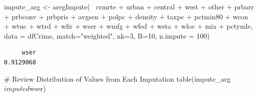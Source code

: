 \documentclass[]{article}
\newenvironment{Shaded}{}{}
\newcommand{\CommentTok}[1]{\textcolor[rgb]{0.00,0.50,0.00}{#1}}
\newcommand{\DataTypeTok}[1]{#1}
\newcommand{\DecValTok}[1]{#1}
\newcommand{\KeywordTok}[1]{\textcolor[rgb]{0.00,0.00,1.00}{#1}}
\newcommand{\NormalTok}[1]{#1}
\newcommand{\OperatorTok}[1]{#1}
\newcommand{\StringTok}[1]{\textcolor[rgb]{0.00,0.50,0.50}{#1}}
\begin{document}
\begin{Shaded}
\begin{Highlighting}[]
\NormalTok{impute_arg <-}\StringTok{ }\KeywordTok{aregImpute}\NormalTok{(}\OperatorTok{~}\StringTok{ }\NormalTok{crmrte }\OperatorTok{+}\StringTok{  }\NormalTok{urban }\OperatorTok{+}\StringTok{ }\NormalTok{central }\OperatorTok{+}\StringTok{ }\NormalTok{west }\OperatorTok{+}\StringTok{ }\NormalTok{other }\OperatorTok{+}
\StringTok{                         }\NormalTok{prbarr }\OperatorTok{+}\StringTok{ }\NormalTok{prbconv }\OperatorTok{+}\StringTok{ }\NormalTok{prbpris }\OperatorTok{+}\StringTok{ }\NormalTok{avgsen }\OperatorTok{+}\StringTok{ }\NormalTok{polpc }\OperatorTok{+}
\StringTok{                         }\NormalTok{density }\OperatorTok{+}\StringTok{ }\NormalTok{taxpc }\OperatorTok{+}\StringTok{ }\NormalTok{pctmin80 }\OperatorTok{+}\StringTok{ }\NormalTok{wcon }\OperatorTok{+}\StringTok{ }\NormalTok{wtuc }\OperatorTok{+}
\StringTok{                         }\NormalTok{wtrd }\OperatorTok{+}\StringTok{ }\NormalTok{wfir }\OperatorTok{+}\StringTok{ }\NormalTok{wser }\OperatorTok{+}\StringTok{ }\NormalTok{wmfg }\OperatorTok{+}\StringTok{ }\NormalTok{wfed }\OperatorTok{+}\StringTok{ }\NormalTok{wsta }\OperatorTok{+}\StringTok{ }\NormalTok{wloc }\OperatorTok{+}
\StringTok{                         }\NormalTok{mix }\OperatorTok{+}\StringTok{ }\NormalTok{pctymle, }\DataTypeTok{data =}\NormalTok{ dfCrime, }\DataTypeTok{match=}\StringTok{"weighted"}\NormalTok{,}
                         \DataTypeTok{nk=}\DecValTok{3}\NormalTok{, }\DataTypeTok{B=}\DecValTok{10}\NormalTok{, }\DataTypeTok{n.impute =} \DecValTok{100}\NormalTok{)}
\end{Highlighting}
\end{Shaded}

\begin{Shaded}
\end{Shaded}

\begin{verbatim}
     wser 
0.9129068 
\end{verbatim}

\begin{Shaded}
\begin{Highlighting}[]
\CommentTok{# Review Distribution of Values from Each Imputation}
\KeywordTok{table}\NormalTok{(impute_arg}\OperatorTok{$}\NormalTok{imputed}\OperatorTok{$}\NormalTok{wser)}
\end{Highlighting}
\end{Shaded}
\end{document}
